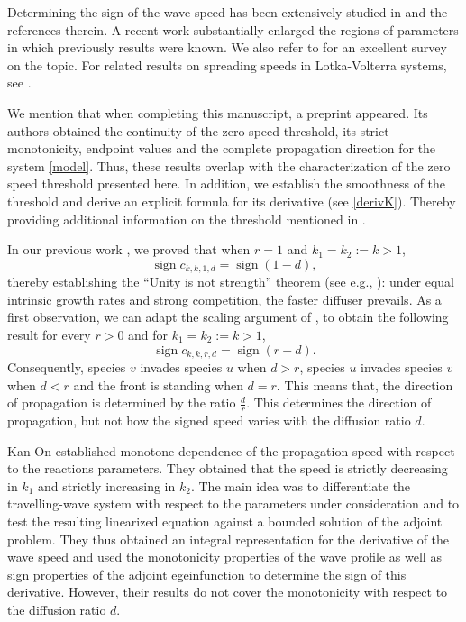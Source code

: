\documentclass[11pt]{article}
\DeclareMathOperator{\sign}{sign}
\numberwithin{equation}{section}
\newcommand{\1}{\mathbbm{1}}
\numberwithin{equation}{section}
\theoremstyle{definition}
\numberwithin{equation}{section}
\begin{document}
Determining the sign of the wave speed has been extensively studied in  \cite{alfaro2023, chang2023, chen2026, girardin2015, guo2013, ma2019, morita2023,  rodrigo2000,rodrigo2001, risler2017, xiao2025} and the references therein. A recent work \cite{nakamura2026} substantially enlarged the regions of parameters in which  previously results were known. We also refer to \cite{girardin2019} for an excellent survey on the topic. For related results on spreading speeds in Lotka-Volterra systems, see \cite{carrere2018, peng2021}. 

We mention that when completing this manuscript, a preprint \cite{ma2026} appeared. Its authors obtained the continuity of the zero speed threshold, its strict monotonicity, endpoint values and the complete propagation direction for the system \eqref{model}.  Thus, these results overlap with the characterization of the zero speed threshold presented here. In addition, we establish the smoothness of the threshold and derive an explicit formula for its derivative (see \eqref{derivK}). Thereby providing additional information on the threshold mentioned in \cite[Remark 5.6]{ma2026}. 

In our previous work \cite{kenne2026}, we proved that when $r=1$ and $k_1=k_2:=k>1$,
\begin{equation*}
	\sign c_{k,k,1,d}=\sign(1-d),
\end{equation*}
thereby establishing the ``Unity is not strength'' theorem (see e.g., \cite{girardin2019, girardin2018}): under equal intrinsic growth rates and strong competition, the faster diffuser prevails. As a first observation, we can adapt the scaling argument of \cite{guo2013}, to obtain the following result for every $r>0$ and for $k_1=k_2:=k>1$,
\begin{equation*}
	\sign c_{k,k, r,d}=\sign(r-d).
\end{equation*}
Consequently, species $v$ invades species $u$ when $d>r$, species $u$ invades species $v$ when $d<r$ and the front is standing when $d=r$. This means that, the direction of propagation is determined by the  ratio $\frac{d}{r}$. This determines the direction of propagation, but not how the signed speed varies with the diffusion ratio $d$. 

Kan-On \cite{kan1995} established monotone dependence of the propagation speed with respect to the reactions parameters. They obtained that the speed is strictly decreasing in $k_1$ and strictly increasing in $k_2$. The main idea was to differentiate the travelling-wave system with respect to the parameters under consideration and to test the resulting linearized equation against a bounded solution of the adjoint problem. They thus obtained an integral representation for the derivative of the wave speed and used the monotonicity properties of the wave profile as well as sign properties of the adjoint egeinfunction to determine the sign of this derivative.  However, their results do not cover the monotonicity with respect to the diffusion ratio $d$. 
\end{document}
